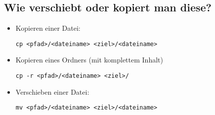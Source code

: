 \documentclass[a4paper,12pt]{article}
\begin{document}
\subsection{Wie verschiebt oder kopiert man diese?}
\begin{itemize} 
\item Kopieren einer Datei: 
\begin{lstlisting}
cp <pfad>/<dateiname> <ziel>/<dateiname>
\end{lstlisting} 
\item Kopieren eines Ordners (mit komplettem Inhalt)
\begin{lstlisting}
cp -r <pfad>/<dateiname> <ziel>/
\end{lstlisting} 
\item Verschieben einer Datei:
\begin{lstlisting}
mv <pfad>/<dateiname> <ziel>/<dateiname>
\end{lstlisting} 
\end{itemize}
\end{document}
